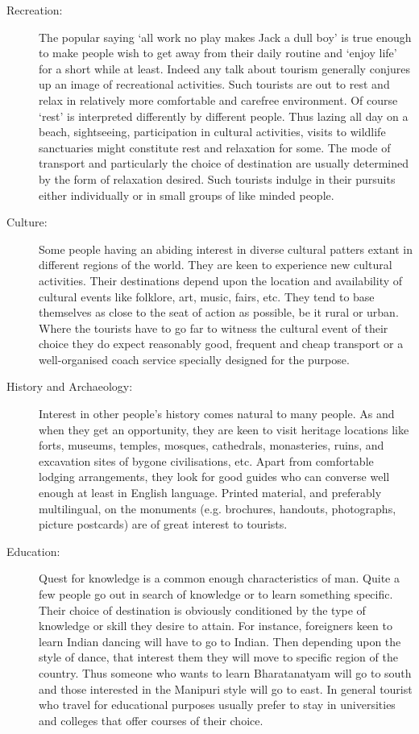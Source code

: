 \begin{description}

  \item[Recreation:] The popular saying `all work no play makes Jack a dull boy' is true enough to make people wish to get away from their daily routine and `enjoy life' for a short while at least. Indeed any talk about tourism generally conjures up an image of recreational activities. Such tourists are out to rest and relax in relatively more comfortable and carefree environment. Of course `rest' is interpreted differently by different people. Thus lazing all day on a beach, sightseeing, participation in cultural activities, visits to wildlife sanctuaries might constitute rest and relaxation for some. The mode of transport and particularly the choice of destination are usually determined by the form of relaxation desired. Such tourists indulge in their pursuits either individually or in small groups of like minded people.

  \item[Culture:] Some people having an abiding interest in diverse cultural patters extant in different regions of the world. They are keen to experience new cultural activities. Their destinations depend upon the location and availability of cultural events like folklore, art, music, fairs, etc. They tend to base themselves as close to the seat of action as possible, be it rural or urban. Where the tourists have to go far to witness the cultural event of their choice they do expect reasonably good, frequent and cheap transport or a well-organised coach service specially designed for the purpose.

  \item[History and Archaeology:] Interest in other people's history comes natural to many people. As and when they get an opportunity, they are keen to visit heritage locations like forts, museums, temples, mosques, cathedrals, monasteries, ruins, and excavation sites of bygone civilisations, etc. Apart from comfortable lodging arrangements, they look for good guides who can converse well enough at least in English language. Printed material, and preferably multilingual, on the monuments (e.g. brochures, handouts, photographs, picture postcards) are of great interest to tourists.

  \item[Education:] Quest for knowledge is a common enough characteristics of man. Quite a few people go out in search of knowledge or to learn something specific. Their choice of destination is obviously conditioned by the type of knowledge or skill they desire to attain. For instance, foreigners keen to learn Indian dancing will have to go to Indian. Then depending upon the style of dance, that interest them they will move to specific region of the country. Thus someone who wants to learn Bharatanatyam will go to south and those interested in the Manipuri style will go to east. In general tourist who travel for educational purposes usually prefer to stay in universities and colleges that offer courses of their choice.


\end{description}

